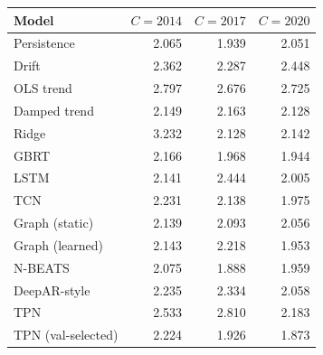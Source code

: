 \begin{tabular}{@{}lrrr@{}}
\toprule
Model & $C=2014$ & $C=2017$ & $C=2020$ \\
\midrule
Persistence & 2.065 & 1.939 & 2.051 \\
Drift & 2.362 & 2.287 & 2.448 \\
OLS trend & 2.797 & 2.676 & 2.725 \\
Damped trend & 2.149 & 2.163 & 2.128 \\
Ridge & 3.232 & 2.128 & 2.142 \\
GBRT & 2.166 & 1.968 & 1.944 \\
LSTM & 2.141 & 2.444 & 2.005 \\
TCN & 2.231 & 2.138 & 1.975 \\
Graph (static) & 2.139 & 2.093 & 2.056 \\
Graph (learned) & 2.143 & 2.218 & 1.953 \\
N-BEATS & 2.075 & 1.888 & 1.959 \\
DeepAR-style & 2.235 & 2.334 & 2.058 \\
TPN & 2.533 & 2.810 & 2.183 \\
TPN (val-selected) & 2.224 & 1.926 & 1.873 \\
\bottomrule
\end{tabular}
